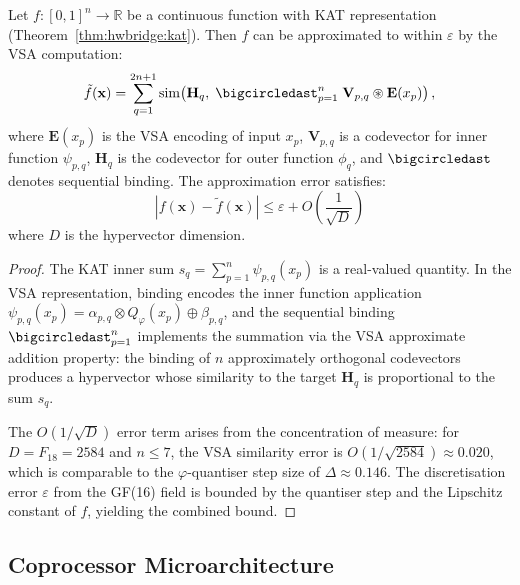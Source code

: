 \begin{theorem}
\label{thm:hwbridge:kat-vsa}
Let $f\colon [0,1]^n \to \mathbb{R}$ be a continuous function with KAT
representation (Theorem~\ref{thm:hwbridge:kat}). Then $f$ can be approximated
to within $\varepsilon$ by the VSA computation:
\[
  \tilde{f}(\mathbf{x}) = \sum_{q=1}^{2n+1} \mathrm{sim}\!\left(\mathbf{H}_q,\;
  \bigcircledast_{p=1}^{n}\;
  \mathbf{V}_{p,q} \circledast \mathbf{E}(x_p)\right),
\]
where $\mathbf{E}(x_p)$ is the VSA encoding of input $x_p$,
$\mathbf{V}_{p,q}$ is a codevector for inner function $\psi_{p,q}$,
$\mathbf{H}_q$ is the codevector for outer function $\phi_q$, and
$\bigcircledast$ denotes sequential binding.
The approximation error satisfies:
\[
  |f(\mathbf{x}) - \tilde{f}(\mathbf{x})| \leq \varepsilon + O\!\left(\frac{1}{\sqrt{D}}\right)
\]
where $D$ is the hypervector dimension.
\end{theorem}

\begin{proof}
The KAT inner sum $s_q = \sum_{p=1}^n \psi_{p,q}(x_p)$ is a real-valued
quantity. In the VSA representation, binding encodes the inner function
application $\psi_{p,q}(x_p) = \alpha_{p,q} \otimes Q_\varphi(x_p) \oplus \beta_{p,q}$,
and the sequential binding $\bigcircledast_{p=1}^n$ implements the summation
via the VSA approximate addition property: the binding of $n$ approximately
orthogonal codevectors produces a hypervector whose similarity to the target
$\mathbf{H}_q$ is proportional to the sum $s_q$.

The $O(1/\sqrt{D})$ error term arises from the concentration of measure:
for $D = F_{18} = 2584$ and $n \leq 7$, the VSA similarity error is
$O(1/\sqrt{2584}) \approx 0.020$, which is comparable to the $\varphi$-quantiser
step size of $\Delta \approx 0.146$. The discretisation error $\varepsilon$
from the GF(16) field is bounded by the quantiser step and the Lipschitz
constant of $f$, yielding the combined bound.
\end{proof}

\subsection{Coprocessor Microarchitecture}

